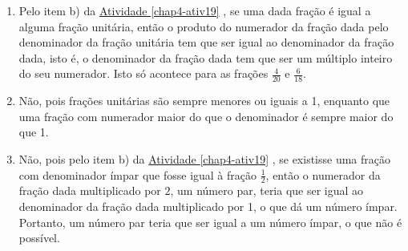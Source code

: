 \begin{solucao}{}{}
\begin{enumerate} [\quad a)] %
    \item       Pelo item b) da \hyperref[chap4-ativ19]{Atividade \ref{chap4-ativ19}}      , se uma dada fração é
igual a alguma fração unitária, então o produto do numerador da fração dada pelo
denominador da fração unitária tem que ser igual ao denominador da fração dada,
isto é, o denominador da fração dada tem que ser um múltiplo inteiro do seu
numerador. Isto só acontece para as frações       $\frac{4}{20}$       e
$\frac{6}{18}$.
    \item       Não, pois frações unitárias são sempre menores ou iguais a 1,
enquanto que uma fração com numerador maior do que o denominador é sempre maior
do que 1.

    \item       Não, pois pelo item b) da \hyperref[chap4-ativ19]{Atividade \ref{chap4-ativ19}}      , se
existisse uma fração com denominador ímpar que fosse igual à fração
$\frac{1}{2}$, então o numerador da fração dada multiplicado por       $2$, um
número par, teria que ser igual ao denominador da fração dada multiplicado por
1, o que dá um número ímpar. Portanto, um número par teria que ser igual a um
número ímpar, o que não é possível.
\end{enumerate} %

\end{solucao}
\pagebreak

